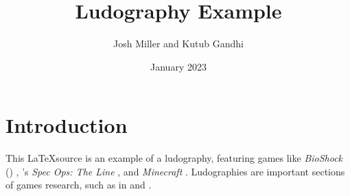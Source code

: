 \documentclass[sigconf]{acmart}
\title{Ludography Example}
\author{Josh Miller and Kutub Gandhi}
\date{January 2023}
\newcommand{\citegameprefix}{G}
\begin{document}
\maketitle

\section{Introduction}

This \LaTeX source is an example of a ludography, featuring games like \emph{BioShock} (\citeyear{bioshock}) , \citeauthor{specops}'s  \emph{Spec Ops: The Line} , and \emph{Minecraft} . Ludographies are important sections of games research, such as in \cite{gandhi_philosophy_2022} and \cite{poretski2022press}.



\renewcommand{\bibnumfmt}[1]{[\citegameprefix#1]}%

\renewcommand{\bibnumfmt}[1]{[#1]}%


\end{document}
